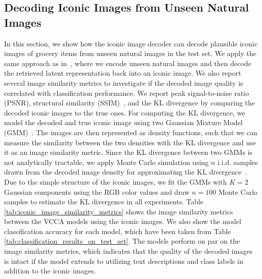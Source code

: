 



\subsection{Decoding Iconic Images from Unseen Natural Images}
\label{paperB:sec:decoding_iconic_images} 

In this section, we show how the iconic image decoder can decode plausible iconic images of grocery items from unseen natural images in the test set. We apply the same approach as in~, where we encode unseen natural images and then decode the retrieved latent representation back into an iconic image. We also report several image similarity metrics to investigate if the decoded image quality is correlated with classification performance.
We report peak signal-to-noise ratio (PSNR), structural similarity (SSIM)~, and the KL divergence by comparing the decoded iconic images to the true ones. For computing the KL divergence, we model the decoded and true iconic image using two Gaussian Mixture Model (GMM)~. The images are then represented as density functions, such that we can measure the similarity between the two densities with the KL divergence and use it as an image similarity metric. Since the KL divergence between two GMMs is not analytically tractable, we apply Monte Carlo simulation using $n$ i.i.d. samples drawn from the decoded image density for approximating the KL divergence~. 
Due to the simple structure of the iconic images, we fit the GMMs with $K=2$ Gaussian components using the RGB color values and draw $n=100$ Monte Carlo samples to estimate the KL divergence in all experiments. 
Table \ref{tab:iconic_image_similarity_metrics} shows the image similarity metrics between the VCCA models using the iconic images. We also show the model classification accuracy for each model, which have been taken from Table \ref{tab:classification_results_on_test_set}. 
The models perform on par on the image similarity metrics, which indicates that the quality of the decoded images is intact if the model extends to utilizing text descriptions and class labels in addition to the iconic images.

